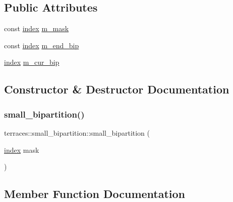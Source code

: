 \subsection*{Public Attributes}
\begin{DoxyCompactItemize}
\item 
const \hyperlink{namespaceterraces_adbc33ccb543d1634e96d0eb02e472c77}{index} \hyperlink{structterraces_1_1small__bipartition_a23458569da8f6402a4c2395a9f5e056f}{m\+\_\+mask}
\item 
const \hyperlink{namespaceterraces_adbc33ccb543d1634e96d0eb02e472c77}{index} \hyperlink{structterraces_1_1small__bipartition_a651c1de5e73b81eefef2497427f9c96c}{m\+\_\+end\+\_\+bip}
\item 
\hyperlink{namespaceterraces_adbc33ccb543d1634e96d0eb02e472c77}{index} \hyperlink{structterraces_1_1small__bipartition_a52eb0315c8109bed2ddfd37d56d77988}{m\+\_\+cur\+\_\+bip}
\end{DoxyCompactItemize}


\subsection{Constructor \& Destructor Documentation}
\mbox{\label{structterraces_1_1small__bipartition_a0f2922ef65a57bd424b0f8a200d5c2b9}} 
\subsubsection{\texorpdfstring{small\+\_\+bipartition()}{small\_bipartition()}}
{\footnotesize\ttfamily terraces\+::small\+\_\+bipartition\+::small\+\_\+bipartition (\begin{DoxyParamCaption}\item[{\hyperlink{namespaceterraces_adbc33ccb543d1634e96d0eb02e472c77}{index}}]{mask }\end{DoxyParamCaption})\hspace{0.3cm}{\ttfamily [inline]}}



\subsection{Member Function Documentation}
\mbox{\label{structterraces_1_1small__bipartition_a8d0f599781285ae580c3fd90254698d0}} 
